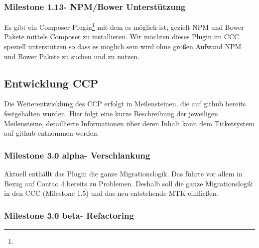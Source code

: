 \documentclass[
paper=a4,
draft=false,%
fontsize=10pt%
]{scrartcl}
\begin{document}
\subsubsection[Milestone 1.13 - NPM/Bower Unterstützung]{Milestone 1.13\footnotemark - NPM/Bower Unterstützung}
\label{subsec:ccc-milestone-1.13}

Es gibt ein Composer Plugin\footnote{} mit dem es möglich ist, gezielt NPM und Bower Pakete mittels Composer zu installieren. Wir möchten dieses Plugin im CCC speziell unterstützen so dass es möglich sein wird ohne großen Aufwand NPM und Bower Pakete zu suchen und zu nutzen.

\pagebreak

\subsection{Entwicklung CCP}
\label{subsec:ccp}

Die Weiterentwicklung des CCP erfolgt in Meilensteinen, die auf github bereits festgehalten wurden. Hier folgt eine kurze Beschreibung der jeweiligen Meilensteine, detaillierte Informationen über deren Inhalt kann dem Ticketsystem auf github entnommen werden.

\subsubsection[Milestone 3.0 alpha - Verschlankung]{Milestone 3.0 alpha\footnotemark - Verschlankung}
\label{subsec:ccp-milestone-3.0-alpha}

Aktuell enthällt das Plugin die ganze Migrationslogik. Das führte vor allem in Bezug auf Contao 4 bereits zu Problemen. Deshalb soll die ganze Migrationslogik in den CCC (Milestone 1.5) und das neu entstehende MTK einfließen.

\subsubsection[Milestone 3.0 beta - Refactoring]{Milestone 3.0 beta\footnotemark - Refactoring}
\label{subsec:ccp-milestone-3.0-beta}
\end{document}
